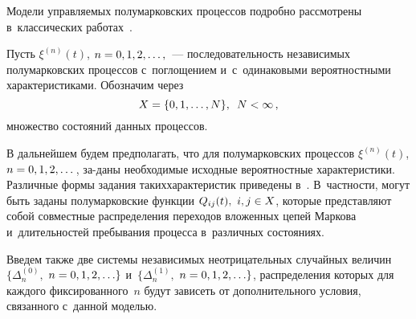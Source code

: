 \begin{multicols}{2}
Модели управляемых полумарковских процессов подробно рассмотрены в~классических 
работах~\cite{Jewell, Mine}.

Пусть $\xi^{(n)}(t)$, $n\hm=0,1,2,\ldots,$~--- последовательность независимых 
полумарковских процессов с~поглощением и~с~одинаковыми вероятностными 
характеристиками. Обозначим через 
$$
X=\{0,1,\ldots ,N\},\enskip N\hm<\infty\,, 
$$
множество состояний данных процессов.

В дальнейшем будем предполагать, что для полумарковских процессов 
$\xi^{(n)}(t)$, $n\hm=0,1,2,\dots$, за-\linebreak даны необходимые исходные вероятностные 
характеристики. Различные формы задания таких\linebreak характеристик приведены 
в~\cite{KorolukTurbin}. В~част\-ности, могут быть заданы полумарковские функции 
$Q_{ij}(t),~i,j\hm\in X$, которые представляют собой совместные распределения 
переходов вложенных цепей Маркова и~длительностей пребывания процесса 
в~различных состояниях.

Введем также две системы независимых не\-от\-ри\-ца\-тель\-ных случайных величин 
$\{\Delta_n^{(0)},$ $n\hm=0,1,2,\ldots\}$ 
и~$\{\Delta_n^{(1)},$ $n\hm=0,1,2,\ldots\}$, 
распределения которых для каждого фиксированного~$n$ будут зависеть от 
дополнительного условия, связанного с~данной моделью.


\end{multicols}
